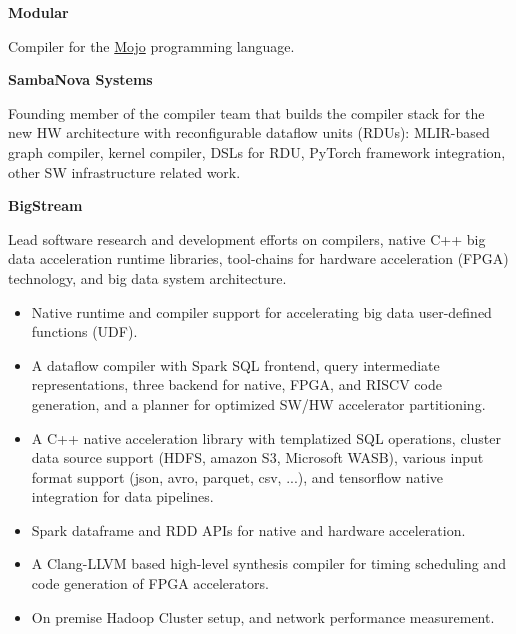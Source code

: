 \textbf{Modular}

\vspace{2mm}
Compiler for the \href{https://www.modular.com/mojo}{Mojo} programming language.
\vspace{2mm}

\textbf{SambaNova Systems}

\vspace{2mm}
Founding member of the compiler team that builds the compiler stack for the new HW architecture with reconfigurable dataflow units (RDUs): 
MLIR-based graph compiler, kernel compiler, DSLs for RDU, PyTorch framework integration, other SW infrastructure related work.
\vspace{2mm}


\textbf{BigStream}

\vspace{2mm}
Lead software research and development efforts on compilers, native C++ big data acceleration runtime libraries, tool-chains for hardware acceleration (FPGA) technology, and big data system architecture.
\begin{itemize}
\item Native runtime and compiler support for accelerating big data user-defined functions (UDF).
\item A dataflow compiler with Spark SQL frontend, query intermediate representations, three backend for native, FPGA, and RISCV code generation, and a planner for optimized SW/HW accelerator partitioning.
\item A C++ native acceleration library with templatized SQL operations, cluster data source support (HDFS, amazon S3, Microsoft WASB), various input format support (json, avro, parquet, csv, ...), and tensorflow native integration for data pipelines.
\item Spark dataframe and RDD APIs for native and hardware acceleration. 
\item A Clang-LLVM based high-level synthesis compiler for timing scheduling and code generation of FPGA accelerators.
\item On premise Hadoop Cluster setup, and network performance measurement. 
\end{itemize}
\vspace{2mm}

